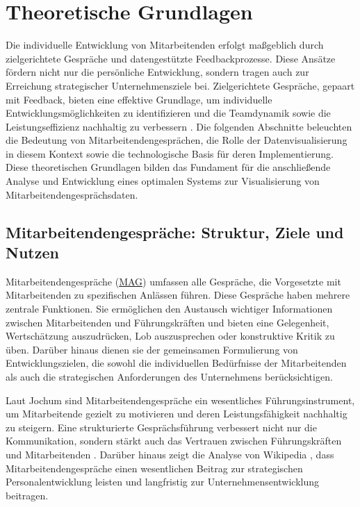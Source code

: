 \chapter{Theoretische Grundlagen}
\label{chap:theoretische-grundlagen}

Die individuelle Entwicklung von Mitarbeitenden erfolgt maßgeblich durch zielgerichtete Gespräche und datengestützte Feedbackprozesse. Diese Ansätze fördern nicht nur die persönliche Entwicklung, sondern tragen auch zur Erreichung strategischer Unternehmensziele bei. Zielgerichtete Gespräche, gepaart mit Feedback, bieten eine effektive Grundlage, um individuelle Entwicklungsmöglichkeiten zu identifizieren und die Teamdynamik sowie die Leistungseffizienz nachhaltig zu verbessern \cite{locke2002goal}. Die folgenden Abschnitte beleuchten die Bedeutung von Mitarbeitendengesprächen, die Rolle der Datenvisualisierung in diesem Kontext sowie die technologische Basis für deren Implementierung. Diese theoretischen Grundlagen bilden das Fundament für die anschließende Analyse und Entwicklung eines optimalen Systems zur Visualisierung von Mitarbeitendengesprächsdaten.


\section{Mitarbeitendengespräche: Struktur, Ziele und Nutzen}
Mitarbeitendengespräche (\hyperref[abkuerzungen]{MAG}) umfassen alle Gespräche, die Vorgesetzte mit Mitarbeitenden zu spezifischen Anlässen führen. Diese Gespräche haben mehrere zentrale Funktionen. Sie ermöglichen den Austausch wichtiger Informationen zwischen Mitarbeitenden und Führungskräften und bieten eine Gelegenheit, Wertschätzung auszudrücken, Lob auszusprechen oder konstruktive Kritik zu üben. Darüber hinaus dienen sie der gemeinsamen Formulierung von Entwicklungszielen, die sowohl die individuellen Bedürfnisse der Mitarbeitenden als auch die strategischen Anforderungen des Unternehmens berücksichtigen.

Laut Jochum \cite{jochum2019} sind Mitarbeitendengespräche ein wesentliches Führungsinstrument, um Mitarbeitende gezielt zu motivieren und deren Leistungsfähigkeit nachhaltig zu steigern. Eine strukturierte Gesprächsführung verbessert nicht nur die Kommunikation, sondern stärkt auch das Vertrauen zwischen Führungskräften und Mitarbeitenden \cite{unigraz2020}. Darüber hinaus zeigt die Analyse von Wikipedia \cite{wikiMAG2023}, dass Mitarbeitendengespräche einen wesentlichen Beitrag zur strategischen Personalentwicklung leisten und langfristig zur Unternehmensentwicklung beitragen.


